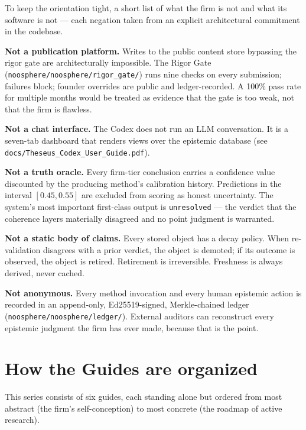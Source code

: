 \documentclass[11pt,letterpaper]{article}
\newcommand{\file}[1]{\texttt{#1}}
\begin{document}
To keep the orientation tight, a short list of what the firm is not and what its software is not --- each negation taken from an explicit architectural commitment in the codebase.

\textbf{Not a publication platform.} Writes to the public content store bypassing the rigor gate are architecturally impossible. The Rigor Gate (\file{noosphere/noosphere/rigor\_gate/}) runs nine checks on every submission; failures block; founder overrides are public and ledger-recorded. A 100\% pass rate for multiple months would be treated as evidence that the gate is too weak, not that the firm is flawless.

\textbf{Not a chat interface.} The Codex does not run an LLM conversation. It is a seven-tab dashboard that renders views over the epistemic database (see \file{docs/Theseus\_Codex\_User\_Guide.pdf}).

\textbf{Not a truth oracle.} Every firm-tier conclusion carries a confidence value discounted by the producing method's calibration history. Predictions in the interval $[0.45, 0.55]$ are excluded from scoring as honest uncertainty. The system's most important first-class output is \texttt{unresolved} --- the verdict that the coherence layers materially disagreed and no point judgment is warranted.

\textbf{Not a static body of claims.} Every stored object has a decay policy. When re-validation disagrees with a prior verdict, the object is demoted; if its outcome is observed, the object is retired. Retirement is irreversible. Freshness is always derived, never cached.

\textbf{Not anonymous.} Every method invocation and every human epistemic action is recorded in an append-only, Ed25519-signed, Merkle-chained ledger (\file{noosphere/noosphere/ledger/}). External auditors can reconstruct every epistemic judgment the firm has ever made, because that is the point.

\section{How the Guides are organized}

This series consists of six guides, each standing alone but ordered from most abstract (the firm's self-conception) to most concrete (the roadmap of active research).
\end{document}
